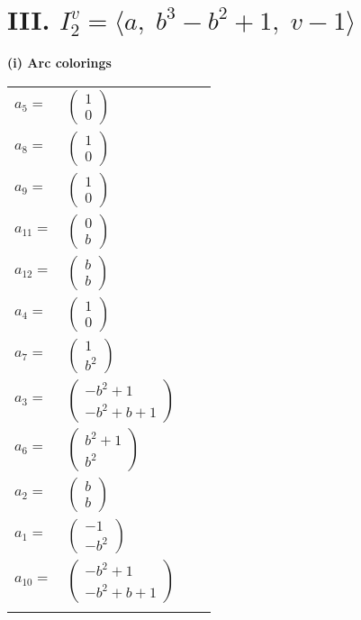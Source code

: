 \documentclass[1p]{elsarticle_modified}
\theoremstyle{definition}
\begin{document}
\centering \section*{III. $I^v_{2}= \langle a,\;b^3- b^2+1,\;v-1 \rangle$}
\flushleft \textbf{(i) Arc colorings}\\
\begin{tabular}{m{7pt} m{180pt} m{7pt} m{180pt} }
\flushright $a_{5}=$&$\begin{pmatrix}1\\0\end{pmatrix}$ \\
\flushright $a_{8}=$&$\begin{pmatrix}1\\0\end{pmatrix}$ \\
\flushright $a_{9}=$&$\begin{pmatrix}1\\0\end{pmatrix}$ \\
\flushright $a_{11}=$&$\begin{pmatrix}0\\b\end{pmatrix}$ \\
\flushright $a_{12}=$&$\begin{pmatrix}b\\b\end{pmatrix}$ \\
\flushright $a_{4}=$&$\begin{pmatrix}1\\0\end{pmatrix}$ \\
\flushright $a_{7}=$&$\begin{pmatrix}1\\b^2\end{pmatrix}$ \\
\flushright $a_{3}=$&$\begin{pmatrix}- b^2+1\\- b^2+b+1\end{pmatrix}$ \\
\flushright $a_{6}=$&$\begin{pmatrix}b^2+1\\b^2\end{pmatrix}$ \\
\flushright $a_{2}=$&$\begin{pmatrix}b\\b\end{pmatrix}$ \\
\flushright $a_{1}=$&$\begin{pmatrix}-1\\- b^2\end{pmatrix}$ \\
\flushright $a_{10}=$&$\begin{pmatrix}- b^2+1\\- b^2+b+1\end{pmatrix}$\\&\end{tabular}
\end{document}
